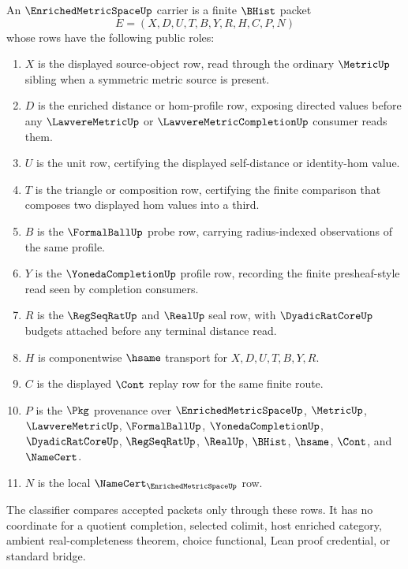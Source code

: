 \begin{definition}
\label{def:enriched-metric-space-carrier}
An $\EnrichedMetricSpaceUp$ carrier is a finite $\BHist$ packet
$$
E=(X,D,U,T,B,Y,R,H,C,P,N)
$$
whose rows have the following public roles:
\begin{enumerate}
\item $X$ is the displayed source-object row, read through the ordinary $\MetricUp$ sibling when a symmetric metric source is present.
\item $D$ is the enriched distance or hom-profile row, exposing directed values before any $\LawvereMetricUp$ or $\LawvereMetricCompletionUp$ consumer reads them.
\item $U$ is the unit row, certifying the displayed self-distance or identity-hom value.
\item $T$ is the triangle or composition row, certifying the finite comparison that composes two displayed hom values into a third.
\item $B$ is the $\FormalBallUp$ probe row, carrying radius-indexed observations of the same profile.
\item $Y$ is the $\YonedaCompletionUp$ profile row, recording the finite presheaf-style read seen by completion consumers.
\item $R$ is the $\RegSeqRatUp$ and $\RealUp$ seal row, with $\DyadicRatCoreUp$ budgets attached before any terminal distance read.
\item $H$ is componentwise $\hsame$ transport for $X,D,U,T,B,Y,R$.
\item $C$ is the displayed $\Cont$ replay row for the same finite route.
\item $P$ is the $\Pkg$ provenance over $\EnrichedMetricSpaceUp$, $\MetricUp$, $\LawvereMetricUp$, $\FormalBallUp$, $\YonedaCompletionUp$, $\DyadicRatCoreUp$, $\RegSeqRatUp$, $\RealUp$, $\BHist$, $\hsame$, $\Cont$, and $\NameCert$.
\item $N$ is the local $\NameCert_{\EnrichedMetricSpaceUp}$ row.
\end{enumerate}
The classifier compares accepted packets only through these rows. It has no coordinate for a quotient completion, selected colimit, host enriched category, ambient real-completeness theorem, choice functional, Lean proof credential, or standard bridge.
\end{definition}

